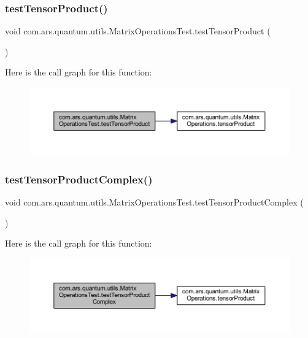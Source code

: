 \subsubsection{\texorpdfstring{test\+Tensor\+Product()}{testTensorProduct()}}
{\footnotesize\ttfamily void com.\+ars.\+quantum.\+utils.\+Matrix\+Operations\+Test.\+test\+Tensor\+Product (\begin{DoxyParamCaption}{ }\end{DoxyParamCaption})}

Here is the call graph for this function\+:\nopagebreak
\begin{figure}[H]
\begin{center}
\leavevmode
\includegraphics[width=350pt]{classcom_1_1ars_1_1quantum_1_1utils_1_1_matrix_operations_test_a531c3daf0534ee2d2776e648f0476ae5_cgraph}
\end{center}
\end{figure}
\hypertarget{classcom_1_1ars_1_1quantum_1_1utils_1_1_matrix_operations_test_ad96b1789d5fc5c530d9e6e64c9b8f374}{}\label{classcom_1_1ars_1_1quantum_1_1utils_1_1_matrix_operations_test_ad96b1789d5fc5c530d9e6e64c9b8f374} 
\subsubsection{\texorpdfstring{test\+Tensor\+Product\+Complex()}{testTensorProductComplex()}}
{\footnotesize\ttfamily void com.\+ars.\+quantum.\+utils.\+Matrix\+Operations\+Test.\+test\+Tensor\+Product\+Complex (\begin{DoxyParamCaption}{ }\end{DoxyParamCaption})}

Here is the call graph for this function\+:\nopagebreak
\begin{figure}[H]
\begin{center}
\leavevmode
\includegraphics[width=350pt]{classcom_1_1ars_1_1quantum_1_1utils_1_1_matrix_operations_test_ad96b1789d5fc5c530d9e6e64c9b8f374_cgraph}
\end{center}
\end{figure}



